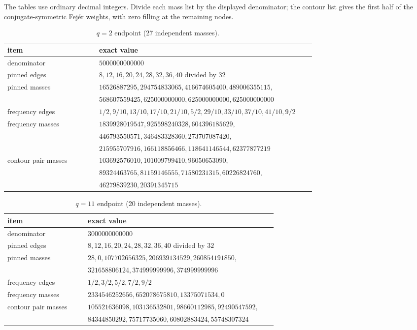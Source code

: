 The tables use ordinary decimal integers.  Divide each mass list by the
displayed denominator; the contour list gives the first half of the
conjugate-symmetric Fej\'er weights, with zero filling at the remaining nodes.

\renewcommand{\arraystretch}{1.12}
{\normalsize
\begin{longtable}{@{}p{0.29\linewidth}p{0.66\linewidth}@{}}
\caption{$q=2$ endpoint (27 independent masses).}\label{tab:q2data}\\
\toprule
item & exact value \\
\midrule
denominator & $5000000000000$\\
pinned edges & $8,12,16,20,24,28,32,36,40$ divided by $32$\\
pinned masses & $16526887295,294754833065,416674605400,489006355115,$\\
& $568607559425,625000000000,625000000000,625000000000$\\
frequency edges & $1/2,9/10,13/10,17/10,21/10,5/2,29/10,33/10,37/10,41/10,9/2$\\
frequency masses & $1839928019547,925598240328,604396185629,$\\
& $446793550571,346483328360,273707087420,$\\
& $215955707916,166118856466,118641146544,62377877219$\\
contour pair masses & $103692576010,101009799410,96050653090,$\\
& $89324463765,81159146555,71580231315,60226824760,$\\
& $46279839230,20391345715$\\
\bottomrule
\end{longtable}
}

{\normalsize
\begin{longtable}{@{}p{0.29\linewidth}p{0.66\linewidth}@{}}
\caption{$q=11$ endpoint (20 independent masses).}\label{tab:q11data}\\
\toprule
item & exact value \\
\midrule
denominator & $3000000000000$\\
pinned edges & $8,12,16,20,24,28,32,36,40$ divided by $32$\\
pinned masses & $28,0,107702656325,206939134529,260854191850,$\\
& $321658806124,374999999996,374999999996$\\
frequency edges & $1/2,3/2,5/2,7/2,9/2$\\
frequency masses & $2334546252656,652078675810,13375071534,0$\\
contour pair masses & $105521636098,103136532801,98660112985,92490547592,$\\
& $84344850292,75717735060,60802883424,55748307324$\\
\bottomrule
\end{longtable}
}
